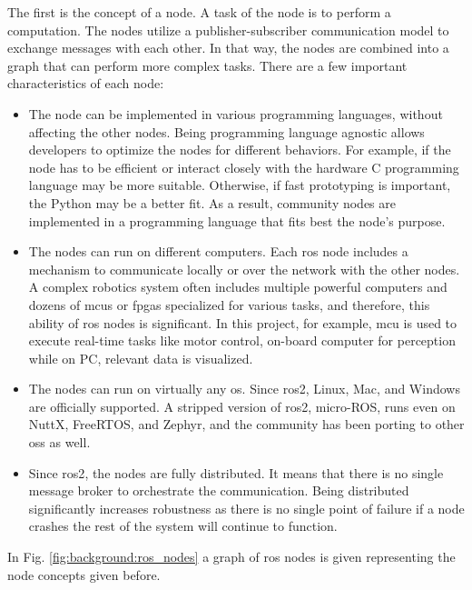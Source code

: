 The first is the concept of a node.
A task of the node is to perform a computation.
The nodes utilize a publisher-subscriber communication model to exchange messages with each other. 
In that way, the nodes are combined into a graph that can perform more complex tasks.
There are a few important characteristics of each node:
\begin{itemize}
    \item The node can be implemented in various programming languages, without affecting the other nodes.
    Being programming language agnostic allows developers to optimize the nodes for different behaviors.
    For example, if the node has to be efficient or interact closely with the hardware C programming language may be more suitable.
    Otherwise, if fast prototyping is important, the Python may be a better fit.
    As a result, community nodes are implemented in a programming language that fits best the node's purpose.
    \item The nodes can run on different computers.
    Each \ac{ros} node includes a mechanism to communicate locally or over the network with the other nodes.
    A complex robotics system often includes multiple powerful computers and dozens of \acp{mcu} or \acp{fpga} specialized for various tasks, and therefore, this ability of \ac{ros} nodes is significant.
    In this project, for example, \ac{mcu} is used to execute real-time tasks like motor control, on-board computer for perception while on PC, relevant data is visualized.
    \item The nodes can run on virtually any \ac{os}.
    Since \ac{ros2}, Linux, Mac, and Windows are officially supported.
    A stripped version of \ac{ros2}, micro-ROS, runs even on NuttX, FreeRTOS, and Zephyr, and the community has been porting to other \acp{os} as well.
    \item Since \ac{ros2}, the nodes are fully distributed. 
    It means that there is no single message broker to orchestrate the communication.
    Being distributed significantly increases robustness as there is no single point of failure if a node crashes the rest of the system will continue to function.
\end{itemize}

In Fig. \ref{fig:background:ros_nodes} a graph of \ac{ros} nodes is given representing the node concepts given before.

